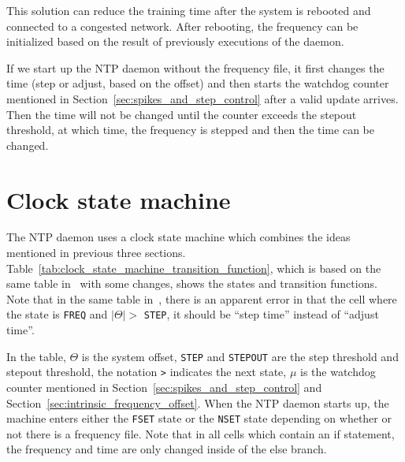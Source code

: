 This solution can reduce the training time after the system is rebooted and
connected to a congested network. After rebooting, the frequency can be
initialized based on the result of previously executions of the daemon.  

If we start up the NTP daemon without the frequency file, it first changes the
time (step or adjust, based on the offset) and then starts the watchdog counter
mentioned in Section~\ref{sec:spikes_and_step_control} after a valid update
arrives. Then the time will not be changed until the counter exceeds the
stepout threshold, at which time, the frequency is stepped and then the time can
be changed.

\section{Clock state machine}%
\label{sec:clock_state_machine}
The NTP daemon uses a clock state machine which combines the ideas mentioned in
previous three sections.
Table~\ref{tab:clock_state_machine_transition_function}, which is based on the
same table in~\cite{redbook} with some changes, shows the states and transition
functions. Note that in the same table in~\cite{rfc5905}, there is an apparent
error in that the cell where the state is \verb|FREQ| and $|\Theta| >$
\verb|STEP|, it should be ``step time'' instead of ``adjust time''.

In the table, $\Theta$ is the system offset, \verb|STEP| and \verb|STEPOUT| are
the step threshold and stepout threshold, the notation \verb|>| indicates the
next state, $\mu$ is the watchdog counter mentioned in
Section~\ref{sec:spikes_and_step_control} and
Section~\ref{sec:intrinsic_frequency_offset}. When the NTP daemon starts up,
the machine enters either the \verb|FSET| state or the \verb|NSET| state
depending on whether or not there is a frequency file. Note that in all cells
which contain an if statement, the frequency and time are only changed inside
of the else branch.

